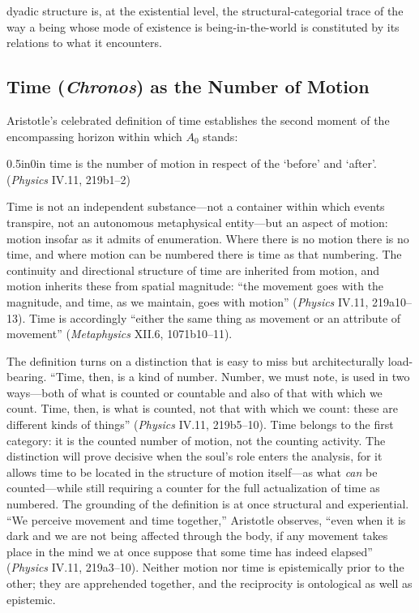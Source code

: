 \documentclass{article}
\begin{document}
dyadic structure is, at the existential level, the structural-categorial trace of the way a being whose mode of existence is being-in-the-world is constituted by its relations to what it encounters.

\subsection{Time (\textit{Chronos}) as the Number of Motion}

Aristotle's celebrated definition of time establishes the second moment of the encompassing horizon within which $A_0$ stands:
\begin{adjustwidth}{0.5in}{0in}
time is the number of motion in respect of the `before' and `after'. (\textit{Physics} IV.11, 219b1--2)
\end{adjustwidth}
Time is not an independent substance---not a container within which events transpire, not an autonomous metaphysical entity---but an aspect of motion: motion insofar as it admits of enumeration. Where there is no motion there is no time, and where motion can be numbered there is time as that numbering. The continuity and directional structure of time are inherited from motion, and motion inherits these from spatial magnitude: ``the movement goes with the magnitude, and time, as we maintain, goes with motion'' (\textit{Physics} IV.11, 219a10--13). Time is accordingly ``either the same thing as movement or an attribute of movement'' (\textit{Metaphysics} XII.6, 1071b10--11).

The definition turns on a distinction that is easy to miss but architecturally load-bearing. ``Time, then, is a kind of number. Number, we must note, is used in two ways---both of what is counted or countable and also of that with which we count. Time, then, is what is counted, not that with which we count: these are different kinds of things'' (\textit{Physics} IV.11, 219b5--10). Time belongs to the first category: it is the counted number of motion, not the counting activity. The distinction will prove decisive when the soul's role enters the analysis, for it allows time to be located in the structure of motion itself---as what \textit{can} be counted---while still requiring a counter for the full actualization of time as numbered. The grounding of the definition is at once structural and experiential. ``We perceive movement and time together,'' Aristotle observes, ``even when it is dark and we are not being affected through the body, if any movement takes place in the mind we at once suppose that some time has indeed elapsed'' (\textit{Physics} IV.11, 219a3--10). Neither motion nor time is epistemically prior to the other; they are apprehended together, and the reciprocity is ontological as well as epistemic.
\end{document}
